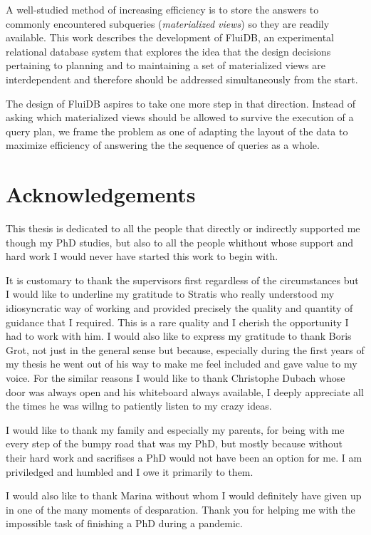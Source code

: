 \begin{precontent}
A well-studied method of increasing efficiency is to store the answers to commonly encountered subqueries (\emph{materialized views}) so they are readily available. This work describes the development of FluiDB, an experimental relational database system that explores the idea that the design decisions pertaining to planning and to maintaining a set of materialized views are interdependent and therefore should be addressed simultaneously from the start.

The design of FluiDB aspires to take one more step in that direction. Instead of asking which materialized views should be allowed to survive the execution of a query plan, we frame the problem as one of adapting the layout of the data to maximize efficiency of answering the the sequence of queries as a whole.

\chapter{Acknowledgements}%

This thesis is dedicated to all the people that directly or indirectly
supported me though my PhD studies, but also to all the people
whithout whose support and hard work I would never have started this
work to begin with.

It is customary to thank the supervisors first regardless of the
circumstances but I would like to underline my gratitude to Stratis
who really understood my idiosyncratic way of working and provided
precisely the quality and quantity of guidance that I required. This
is a rare quality and I cherish the opportunity I had to work with
him. I would also like to express my gratitude to thank Boris Grot,
not just in the general sense but because, especially during the first
years of my thesis he went out of his way to make me feel included and
gave value to my voice. For the similar reasons I would like to thank
Christophe Dubach whose door was always open and his whiteboard always
available, I deeply appreciate all the times he was willng to
patiently listen to my crazy ideas.

I would like to thank my family and especially my parents, for being
with me every step of the bumpy road that was my PhD, but mostly
because without their hard work and sacrifises a PhD would not have
been an option for me. I am priviledged and humbled and I owe it
primarily to them.

I would also like to thank Marina without whom I would definitely have
given up in one of the many moments of desparation. Thank you for
helping me with the impossible task of finishing a PhD during a
pandemic.


\end{precontent}
